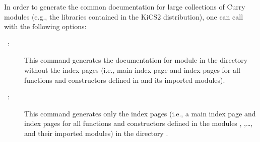 In order to generate the common documentation for large collections
of Curry modules (e.g., the libraries contained in the KiCS2 distribution),
one can call  with the following options:
\begin{description}
\item[~:]
This command generates the documentation for module 
in the directory  without the index pages (i.e., main index page
and index pages for all functions and constructors defined in 
and its imported modules).
\item[~:]
This command generates only the index pages (i.e., a main index page
and index pages for all functions and constructors defined in the modules
, ,\ldots, and their imported modules)
in the directory .
\end{description}

